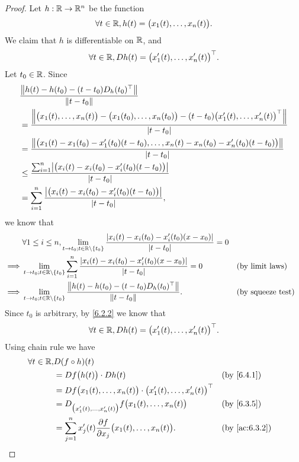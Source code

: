 \begin{proof}
  Let \(h : \R \to \R^n\) be the function
  \[
    \forall t \in \R, h(t) = \big(x_1(t), \dots, x_n(t)\big).
  \]
  We claim that \(h\) is differentiable on \(\R\), and
  \[
    \forall t \in \R, D h(t) = \big(x_1'(t), \dots, x_n'(t)\big)^\top.
  \]
  Let \(t_0 \in \R\).
  Since
  \begin{align*}
     & \dfrac{\norm*{h(t) - h(t_0) - (t - t_0) D_h(t_0)^\top}}{\norm*{t - t_0}}                                                                                  \\
     & = \dfrac{\norm*{\big(x_1(t), \dots, x_n(t)\big) - \big(x_1(t_0), \dots, x_n(t_0)\big) - (t - t_0) \big(x_1'(t), \dots, x_n'(t)\big)^\top}}{\abs{t - t_0}} \\
     & = \dfrac{\norm*{\big(x_1(t) - x_1(t_0) - x_1'(t_0)(t - t_0), \dots, x_n(t) - x_n(t_0) - x_n'(t_0)(t - t_0)\big)}}{\abs{t - t_0}}                          \\
     & \leq \dfrac{\sum_{i = 1}^n \abs{\big(x_i(t) - x_i(t_0) - x_i'(t_0)(t - t_0)\big)}}{\abs{t - t_0}}                                                         \\
     & = \sum_{i = 1}^n \dfrac{\abs{\big(x_i(t) - x_i(t_0) - x_i'(t_0)(t - t_0)\big)}}{\abs{t - t_0}},
  \end{align*}
  we know that
  \begin{align*}
             & \forall 1 \leq i \leq n, \lim_{t \to t_0 ; t \in \R \setminus \set{t_0}} \dfrac{\abs{x_i(t) - x_i(t_0) - x_i'(t_0)(x - x_0)}}{\abs{t - t_0}} = 0                               \\
    \implies & \lim_{t \to t_0 ; t \in \R \setminus \set{t_0}} \sum_{i = 1}^n \dfrac{\abs{x_i(t) - x_i(t_0) - x_i'(t_0)(x - x_0)}}{\abs{t - t_0}} = 0           &  & \text{(by limit laws)}   \\
    \implies & \lim_{t \to t_0 ; t \in \R \setminus \set{t_0}} \dfrac{\norm*{h(t) - h(t_0) - (t - t_0) D_h(t_0)^\top}}{\norm*{t - t_0}}.                        &  & \text{(by squeeze test)}
  \end{align*}
  Since \(t_0\) is arbitrary, by \cref{6.2.2} we know that
  \[
    \forall t \in \R, D h(t) = \big(x_1'(t), \dots, x_n'(t)\big)^\top.
  \]
  Using chain rule we have
  \begin{align*}
    \forall t \in \R, & D (f \circ h)(t)                                                                                             \\
                      & = D f\big(h(t)\big) \cdot D h(t)                                                          &  & \by{6.4.1}    \\
                      & = D f\big(x_1(t), \dots, x_n(t)\big) \cdot \big(x_1'(t), \dots, x_n'(t)\big)^\top                            \\
                      & = D_{\big(x_1'(t), \dots, x_n'(t)\big)} f\big(x_1(t), \dots, x_n(t)\big)                  &  & \by{6.3.5}    \\
                      & = \sum_{j = 1}^n x_j'(t) \dfrac{\partial f}{\partial x_j}\big(x_1(t), \dots, x_n(t)\big). &  & \by{ac:6.3.2}
  \end{align*}
\end{proof}

